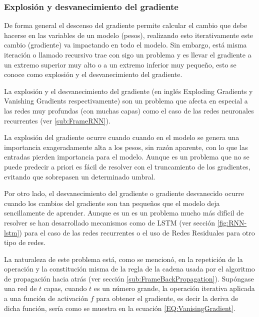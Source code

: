         \subsubsection{Explosión y desvanecimiento del gradiente}
        \label{sub2:GradientVanishing}
        
            De forma general el descenso del gradiente permite calcular el cambio que debe hacerse en las variables de un modelo (pesos), realizando esto iterativamente este cambio (gradiente) va impactando en todo el modelo. Sin embargo, está misma iteración o llamado recursivo trae con sigo un problema y es llevar el gradiente a un extremo superior muy alto o a un extremo inferior muy pequeño, esto se conoce como explosión y el desvanecimiento del gradiente.
        
            La explosión y el desvanecimiento del gradiente (en inglés Exploding Gradients y Vanishing Gradients respectivamente) son un problema que afecta en especial a las redes muy profundas (con muchas capas) como el caso de las redes neuronales recurrentes (ver \ref{sub:FrameRNN}).
            
            La explosión del gradiente ocurre cuando cuando en el modelo se genera una importancia exageradamente alta a los pesos, sin razón aparente, con lo que las entradas pierden importancia para el modelo. Aunque es un problema que no se puede predecir a priori es fácil de resolver con el truncamiento de los gradientes, evitando que sobrepasen un determinado umbral.
            
            Por otro lado, el desvanecimiento del gradiente o gradiente desvanecido ocurre cuando los cambios del gradiente son tan pequeños que el modelo deja sencillamente de aprender. Aunque es un es un problema mucho más difícil de resolver se han desarrollado mecanismos como de LSTM (ver sección \ref{fig:RNN-lstm}) para el caso de las redes recurrentes o el uso de Redes Residuales para otro tipo de redes.
        
            La naturaleza de este problema está, como se mencionó, en la repetición de la operación y la constitución misma de la regla de la cadena usada por el algoritmo de propagación hacia atrás (ver sección \ref{sub:FrameBackPropagation}). Supóngase una red de $t$ capas, cuando $t$ es un número grande, la operación iterativa aplicada a una función de activación $f$ para obtener el gradiente, es decir la deriva de dicha función, sería como se muestra en la ecuación \ref{EQ:VanisingGradient}.
            
